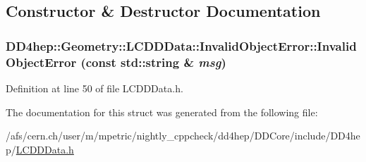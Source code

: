 \subsection{Constructor \& Destructor Documentation}
\hypertarget{struct_d_d4hep_1_1_geometry_1_1_l_c_d_d_data_1_1_invalid_object_error_aaca6af4a0b1d636f7af31f3191f1d998}{
\subsubsection[{InvalidObjectError}]{\setlength{\rightskip}{0pt plus 5cm}DD4hep::Geometry::LCDDData::InvalidObjectError::InvalidObjectError (const std::string \& {\em msg})}}
\label{struct_d_d4hep_1_1_geometry_1_1_l_c_d_d_data_1_1_invalid_object_error_aaca6af4a0b1d636f7af31f3191f1d998}


Definition at line 50 of file LCDDData.h.

The documentation for this struct was generated from the following file:\begin{DoxyCompactItemize}
\item 
/afs/cern.ch/user/m/mpetric/nightly\_\-cppcheck/dd4hep/DDCore/include/DD4hep/\hyperlink{_l_c_d_d_data_8h}{LCDDData.h}\end{DoxyCompactItemize}
